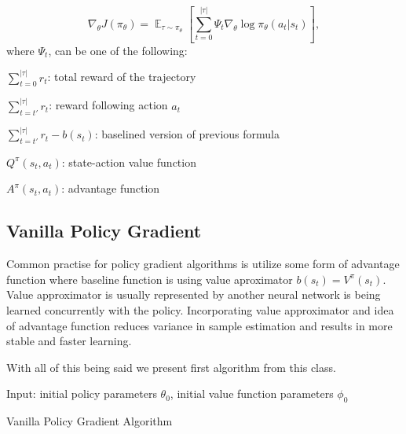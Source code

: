 \[
  \nabla_\theta J(\pi_\theta) = \mathop{\mathbb{E}}_{\tau \sim \pi_\theta}[\sum_{t=0}^{|\tau|} \Psi_t \nabla_\theta \log \pi_\theta(a_t|s_t)],
\]
where $\Psi_t$, can be one of the following:
\begin{list}{}{}
  \item $\sum_{t=0}^{|\tau|} r_t$: total reward of the trajectory
  \item $\sum_{t=t'}^{|\tau|} r_t$: reward following action $a_t$
  \item $\sum_{t=t'}^{|\tau|} r_t - b(s_t)$: baselined version of previous formula
  \item $Q^\pi(s_t,a_t)$: state-action value function
  \item $A^\pi(s_t,a_t)$: advantage function
\end{list}

\subsection{Vanilla Policy Gradient}
Common practise for policy gradient algorithms is utilize some form of advantage function where baseline function is using value aproximator $b(s_t) = V^\pi(s_t)$.
Value approximator is usually represented by another neural network is being learned concurrently with the policy.
Incorporating value approximator and idea of advantage function reduces variance in sample estimation and results in more stable and faster learning.

With all of this being said we present first algorithm from this class.

\begin{algorithm}[H]
  Input: initial policy parameters $\theta_0$, initial value function parameters $\phi_0$
  
  
  \caption{Vanilla Policy Gradient Algorithm}
  \label{Vanilla}
\end{algorithm}

